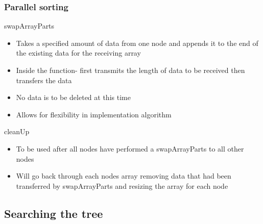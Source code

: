\documentclass[usernames,dvipsnames]{beamer}
\begin{document}
\begin{frame}    
    \frametitle{Parallel sorting}
    
    \begin{block}{swapArrayParts}
        \begin{itemize}
            \item Takes a specified amount of data from one node and appends it to the end of the existing data for the receiving array
            \item Inside the function- first transmits the length of data to be received then transfers the data
            \item No data is to be deleted at this time
            \item Allows for flexibility in implementation algorithm
        \end{itemize}
    \end{block}
    
    \begin{block}{cleanUp}
        \begin{itemize}
            \item To be used after all nodes have performed a swapArrayParts to all other nodes
            \item Will go back through each nodes array removing data that had been transferred by swapArrayParts and resizing the array for each node
        \end{itemize}
    \end{block}
\end{frame}


\subsection{Searching the tree}

\end{document}
